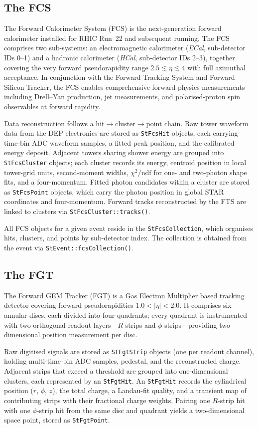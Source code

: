\documentclass[twoside]{article}
\begin{document}
\subsection{The FCS}
The Forward Calorimeter System (FCS) is the next-generation forward calorimeter
installed for RHIC Run~22 and subsequent running.  The FCS comprises two
sub-systems: an electromagnetic calorimeter (\emph{ECal}, sub-detector IDs 0--1)
and a hadronic calorimeter (\emph{HCal}, sub-detector IDs 2--3), together
covering the very forward pseudorapidity range $2.5 \lesssim \eta \lesssim 4$
with full azimuthal acceptance.  In conjunction with the Forward Tracking System
and Forward Silicon Tracker, the FCS enables comprehensive forward-physics
measurements including Drell--Yan production, jet measurements, and
polarised-proton spin observables at forward rapidity.

Data reconstruction follows a hit$\to$cluster$\to$point chain.  Raw tower
waveform data from the DEP electronics are stored as \texttt{StFcsHit} objects,
each carrying time-bin ADC waveform samples, a fitted peak position, and the
calibrated energy deposit.  Adjacent towers sharing shower energy are grouped
into \texttt{StFcsCluster} objects; each cluster records its energy, centroid
position in local tower-grid units, second-moment widths, $\chi^{2}/\text{ndf}$
for one- and two-photon shape fits, and a four-momentum.  Fitted photon candidates
within a cluster are stored as \texttt{StFcsPoint} objects, which carry the photon
position in global STAR coordinates and four-momentum.  Forward tracks reconstructed
by the FTS are linked to clusters via \texttt{StFcsCluster::tracks()}.

All FCS objects for a given event reside in the \texttt{StFcsCollection}, which
organises hits, clusters, and points by sub-detector index.  The collection is
obtained from the event via \verb+StEvent::fcsCollection()+.

\subsection{The FGT}
The Forward GEM Tracker (FGT) is a Gas Electron Multiplier based tracking detector
covering forward pseudorapidities $1.0 < |\eta| < 2.0$.  It comprises six annular discs,
each divided into four quadrants; every quadrant is instrumented with two orthogonal
readout layers---$R$-strips and $\phi$-strips---providing two-dimensional position
measurement per disc.

Raw digitised signals are stored as \texttt{StFgtStrip} objects (one per readout channel),
holding multi-time-bin ADC samples, pedestal, and the reconstructed charge.  Adjacent
strips that exceed a threshold are grouped into one-dimensional clusters, each represented
by an \texttt{StFgtHit}.  An \texttt{StFgtHit} records the cylindrical position
($r$, $\phi$, $z$), the total charge, a Landau-fit quality, and a transient map of
contributing strips with their fractional charge weights.  Pairing one $R$-strip hit with
one $\phi$-strip hit from the same disc and quadrant yields a two-dimensional space point,
stored as \texttt{StFgtPoint}.
\end{document}
